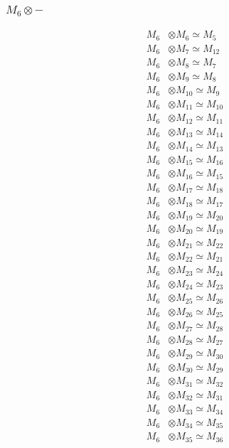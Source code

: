 \subsubsection{$ M_{6}\otimes -$}
\begin{align*}
M_{6} &\otimes M_{6} \simeq M_{5} \\
M_{6} &\otimes M_{7} \simeq M_{12} \\
M_{6} &\otimes M_{8} \simeq M_{7} \\
M_{6} &\otimes M_{9} \simeq M_{8} \\
M_{6} &\otimes M_{10} \simeq M_{9} \\
M_{6} &\otimes M_{11} \simeq M_{10} \\
M_{6} &\otimes M_{12} \simeq M_{11} \\
M_{6} &\otimes M_{13} \simeq M_{14} \\
M_{6} &\otimes M_{14} \simeq M_{13} \\
M_{6} &\otimes M_{15} \simeq M_{16} \\
M_{6} &\otimes M_{16} \simeq M_{15} \\
M_{6} &\otimes M_{17} \simeq M_{18} \\
M_{6} &\otimes M_{18} \simeq M_{17} \\
M_{6} &\otimes M_{19} \simeq M_{20} \\
M_{6} &\otimes M_{20} \simeq M_{19} \\
M_{6} &\otimes M_{21} \simeq M_{22} \\
M_{6} &\otimes M_{22} \simeq M_{21} \\
M_{6} &\otimes M_{23} \simeq M_{24} \\
M_{6} &\otimes M_{24} \simeq M_{23} \\
M_{6} &\otimes M_{25} \simeq M_{26} \\
M_{6} &\otimes M_{26} \simeq M_{25} \\
M_{6} &\otimes M_{27} \simeq M_{28} \\
M_{6} &\otimes M_{28} \simeq M_{27} \\
M_{6} &\otimes M_{29} \simeq M_{30} \\
M_{6} &\otimes M_{30} \simeq M_{29} \\
M_{6} &\otimes M_{31} \simeq M_{32} \\
M_{6} &\otimes M_{32} \simeq M_{31} \\
M_{6} &\otimes M_{33} \simeq M_{34} \\
M_{6} &\otimes M_{34} \simeq M_{35} \\
M_{6} &\otimes M_{35} \simeq M_{36} \\

\end{align*}

